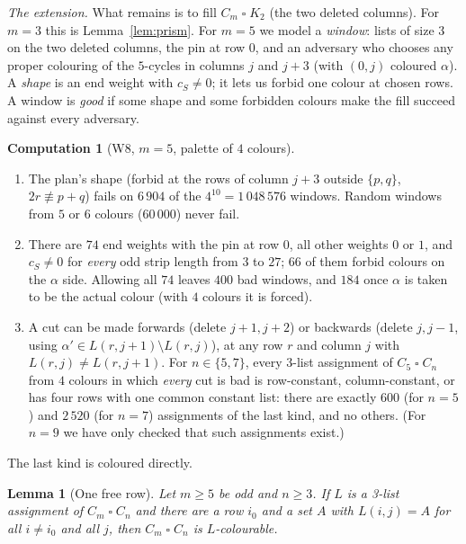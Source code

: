 \documentclass[11pt]{article}
\theoremstyle{plain}
\newtheorem{lemma}[theorem]{Lemma}
\theoremstyle{definition}
\newtheorem{computation}[theorem]{Computation}
\theoremstyle{remark}
\newcommand{\T}{\mathbin{\square}}
\begin{document}
\emph{The extension.} What remains is to fill $C_m \T K_2$ (the two deleted columns). For $m = 3$
this is Lemma~\ref{lem:prism}. For $m = 5$ we model a \emph{window}: lists of size $3$ on the two
deleted columns, the pin at row $0$, and an adversary who chooses any proper colouring of the
$5$-cycles in columns $j$ and $j+3$ (with $(0, j)$ coloured $\alpha$). A \emph{shape} is an end
weight with $c_S \ne 0$; it lets us forbid one colour at chosen rows. A window is \emph{good} if
some shape and some forbidden colours make the fill succeed against every adversary.

\begin{computation}[W8, $m = 5$, palette of $4$ colours]\label{comp:windows}
\begin{enumerate}[label=(\alph*),nosep]
\item The plan's shape (forbid at the rows of column $j+3$ outside $\{p, q\}$, $2r \not\equiv p+q$)
fails on $6\,904$ of the $4^{10} = 1\,048\,576$ windows. Random windows from $5$ or $6$ colours
($60\,000$) never fail.
\item There are $74$ end weights with the pin at row $0$, all other weights $0$ or $1$, and
$c_S \ne 0$ for \emph{every} odd strip length from $3$ to $27$; $66$ of them forbid colours on the
$\alpha$ side. Allowing all $74$ leaves $400$ bad windows, and $184$ once $\alpha$ is taken to be
the actual colour (with $4$ colours it is forced).
\item A cut can be made forwards (delete $j+1, j+2$) or backwards (delete $j, j-1$, using
$\alpha' \in L(r, j+1) \setminus L(r, j)$), at any row $r$ and column $j$ with $L(r, j) \ne L(r,
j+1)$. For $n \in \{5, 7\}$, every 3-list assignment of $C_5 \T C_n$ from $4$ colours in which
\emph{every} cut is bad is row-constant, column-constant, or has four rows with one common
constant list: there are exactly $600$ (for $n = 5$) and $2\,520$ (for $n = 7$) assignments of
the last kind, and no others. (For $n = 9$ we have only checked that such assignments exist.)
\end{enumerate}
\end{computation}

The last kind is coloured directly.

\begin{lemma}[One free row]\label{lem:freerow}
Let $m \ge 5$ be odd and $n \ge 3$. If $L$ is a 3-list assignment of $C_m \T C_n$ and there are a
row $i_0$ and a set $A$ with $L(i, j) = A$ for all $i \ne i_0$ and all $j$, then $C_m \T C_n$ is
$L$-colourable.
\end{lemma}
\end{document}
